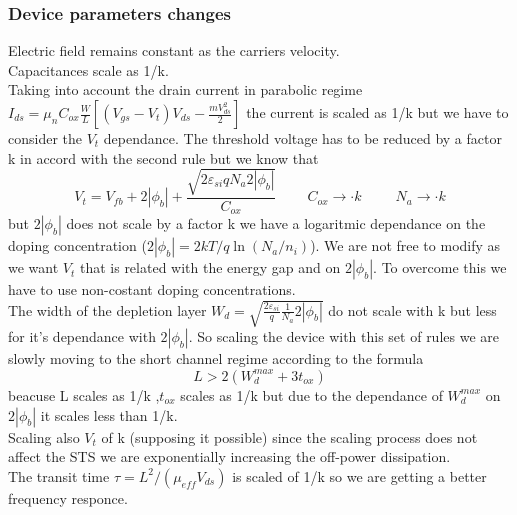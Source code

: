 \subsubsection{Device parameters changes}
Electric field remains constant as the carriers velocity.\\
Capacitances scale as 1/k.\\
Taking into account the drain current in parabolic regime $I_{ds}=\mu_nC_{ox}\frac{W}{L}[(V_{gs}-V_t)V_{ds}-\frac{mV_{ds}^2}{2}]$ the current is scaled as 1/k but we have to consider the $V_t$ dependance. The threshold voltage has to be reduced by a factor k in accord with the second rule but we know that 
\begin{equation}
V_t=V_{fb}+2|\phi_b|+\frac{\sqrt{2\varepsilon_{si}qN_a2|\phi_b|}}{C_{ox}} \ \ \ \ \ \ \ \ \ \ C_{ox}\rightarrow \cdot k \ \ \ \ \ \ \ \ \ \ \ N_a \rightarrow \cdot k
\end{equation}
but $2|\phi_b|$ does not scale by a factor k we have a logaritmic dependance on the doping concentration ($2|\phi_b|=2kT/q\ln(N_a/n_i)$). We are not free to modify as we want $V_t$ that is related with the energy gap and on $2|\phi_b|$. To overcome this we have to use non-costant doping concentrations.\\
The width of the depletion layer $W_d=\sqrt{\frac{2\varepsilon_{si}}{q}\frac{1}{N_a}2|\phi_b|}$ do not scale with k but less for it's dependance with $2|\phi_b|$. So scaling the device with this set of rules we are slowly moving to the short channel regime according to the formula 
\begin{equation}
L>2(W_d^{max}+3t_{ox})
\end{equation}
beacuse L scales as 1/k ,$t_{ox}$ scales as 1/k but due to the dependance of $W_{d}^{max}$ on $2|\phi_b|$ it scales less than 1/k.\\
Scaling also $V_t$ of k (supposing it possible) since the scaling process does not affect the STS we are exponentially increasing the off-power dissipation.\\
The transit time $\tau=L^2/(\mu_{eff}V_{ds})$ is scaled of 1/k so we are getting a better frequency responce.\\

